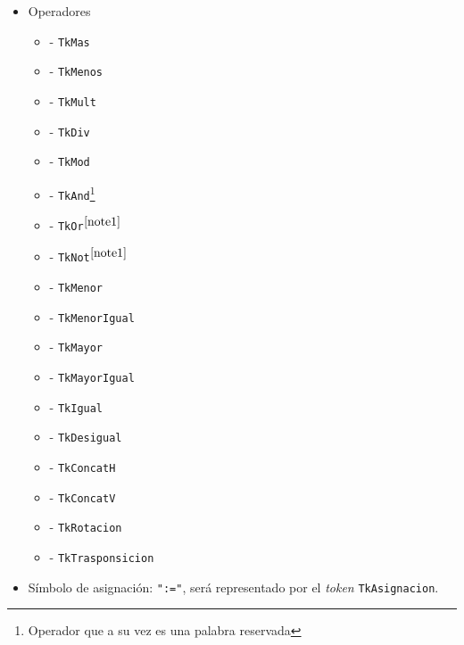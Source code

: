 \documentclass[letterpaper,10pt]{article}
\begin{document}
\begin{itemize}
\begin{itemize}
        \end{itemize}
    \item Operadores
        \begin{itemize}
            \item[]   - \texttt{TkMas}
            \item[]   - \texttt{TkMenos}
            \item[]   - \texttt{TkMult}
            \item[]   - \texttt{TkDiv}
            \item[]  - \texttt{TkMod}
            \item[]  - \texttt{TkAnd}\footnote[2]{\label{note1}Operador que a su vez es una palabra reservada}
            \item[]   - \texttt{TkOr}$^{\ref{note1}}$
            \item[]  - \texttt{TkNot}$^{\ref{note1}}$
            \item[]   - \texttt{TkMenor}
            \item[]  - \texttt{TkMenorIgual}
            \item[]    - \texttt{TkMayor}
            \item[]   - \texttt{TkMayorIgual}
            \item[]   - \texttt{TkIgual}
            \item[]  - \texttt{TkDesigual}
            \item[]   - \texttt{TkConcatH}
            \item[]   - \texttt{TkConcatV}
            \item[]  - \texttt{TkRotacion}
            \item[]   - \texttt{TkTrasponsicion}
        \end{itemize}
    \item Símbolo de asignación: \texttt{":="}, será representado por el \textit{token} \texttt{TkAsignacion}.
\end{itemize}
\end{document}

